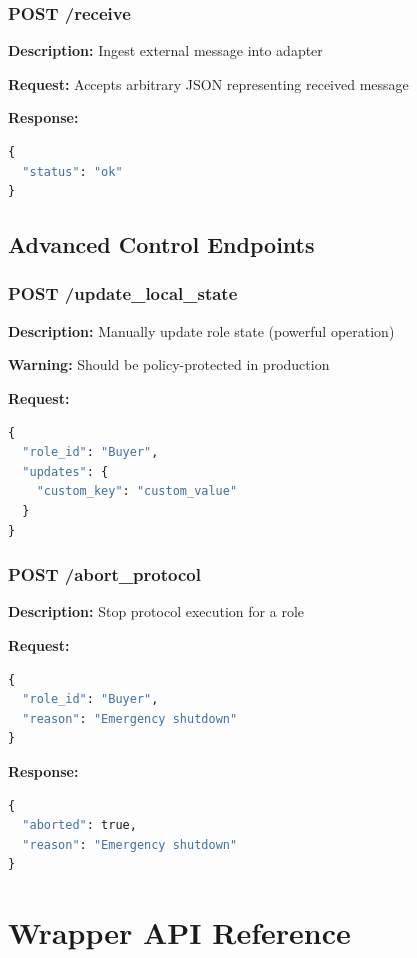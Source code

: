 \documentclass[11pt,a4paper]{article}
\begin{document}
\subsubsection{POST /receive}
\textbf{Description:} Ingest external message into adapter

\textbf{Request:} Accepts arbitrary JSON representing received message

\textbf{Response:}
\begin{lstlisting}[language=python]
{
  "status": "ok"
}
\end{lstlisting}

\subsection{Advanced Control Endpoints}

\subsubsection{POST /update\_local\_state}
\textbf{Description:} Manually update role state (powerful operation)

\textbf{Warning:} Should be policy-protected in production

\textbf{Request:}
\begin{lstlisting}[language=python]
{
  "role_id": "Buyer",
  "updates": {
    "custom_key": "custom_value"
  }
}
\end{lstlisting}

\subsubsection{POST /abort\_protocol}
\textbf{Description:} Stop protocol execution for a role

\textbf{Request:}
\begin{lstlisting}[language=python]
{
  "role_id": "Buyer",
  "reason": "Emergency shutdown"
}
\end{lstlisting}

\textbf{Response:}
\begin{lstlisting}[language=python]
{
  "aborted": true,
  "reason": "Emergency shutdown"
}
\end{lstlisting}

\section{Wrapper API Reference}
\end{document}
